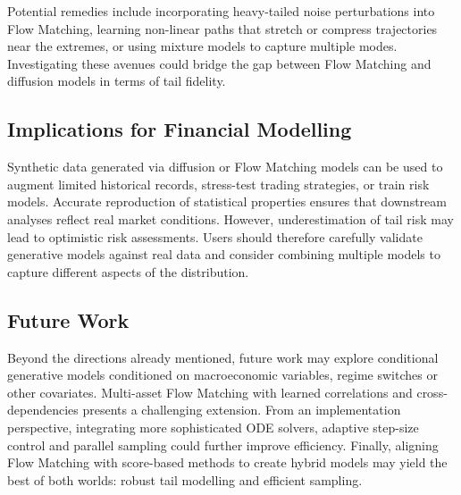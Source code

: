 Potential remedies include incorporating heavy-tailed noise
perturbations into Flow Matching, learning non-linear paths that
stretch or compress trajectories near the extremes, or using mixture
models to capture multiple modes.  Investigating these avenues could
bridge the gap between Flow Matching and diffusion models in terms of
tail fidelity.

\subsection{Implications for Financial Modelling}

Synthetic data generated via diffusion or Flow Matching models can be
used to augment limited historical records, stress-test trading
strategies, or train risk models.  Accurate reproduction of
statistical properties ensures that downstream analyses reflect real
market conditions.  However, underestimation of tail risk may lead to
optimistic risk assessments.  Users should therefore carefully
validate generative models against real data and consider combining
multiple models to capture different aspects of the distribution.

\subsection{Future Work}

Beyond the directions already mentioned, future work may explore
conditional generative models conditioned on macroeconomic variables,
regime switches or other covariates.  Multi-asset Flow Matching with
learned correlations and cross-dependencies presents a challenging
extension.  From an implementation perspective, integrating more
sophisticated ODE solvers, adaptive step-size control and parallel
sampling could further improve efficiency.  Finally, aligning
Flow Matching with score-based methods to create hybrid models may
yield the best of both worlds: robust tail modelling and efficient
sampling.
